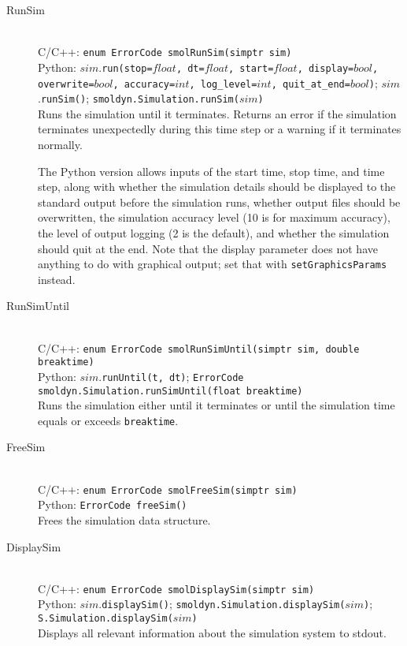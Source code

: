 \documentclass {scrbook}
\newcommand {\ttt} {\texttt}
\begin{document}
\begin{description}
\item[RunSim]
\hfill \\
C/C++: \ttt{enum ErrorCode smolRunSim(simptr sim)}\\
Python: $sim$.\ttt{run(stop=$float$, dt=$float$, start=$float$, display=$bool$, overwrite=$bool$, accuracy=$int$, log\_level=$int$, quit\_at\_end=$bool$)}; $sim$.\ttt{runSim()}; \ttt{smoldyn.Simulation.runSim($sim$)}\\
Runs the simulation until it terminates. Returns an error if the simulation terminates unexpectedly during this time step or a warning if it terminates normally.

The Python version allows inputs of the start time, stop time, and time step, along with whether the simulation details should be displayed to the standard output before the simulation runs, whether output files should be overwritten, the simulation accuracy level (10 is for maximum accuracy), the level of output logging (2 is the default), and whether the simulation should quit at the end. Note that the display parameter does not have anything to do with graphical output; set that with \ttt{setGraphicsParams} instead.

\item[RunSimUntil]
\hfill \\
C/C++: \ttt{enum ErrorCode smolRunSimUntil(simptr sim, double breaktime)}\\
Python: $sim$.\ttt{runUntil(t, dt)}; \ttt{ErrorCode smoldyn.Simulation.runSimUntil(float breaktime)}\\
Runs the simulation either until it terminates or until the simulation time equals or exceeds \ttt{breaktime}.

\item[FreeSim]
\hfill \\
C/C++: \ttt{enum ErrorCode smolFreeSim(simptr sim)}\\
Python: \ttt{ErrorCode freeSim()}\\
Frees the simulation data structure.

\item[DisplaySim]
\hfill \\
C/C++: \ttt{enum ErrorCode smolDisplaySim(simptr sim)}\\
Python: $sim$.\ttt{displaySim()}; \ttt{smoldyn.Simulation.displaySim($sim$)}; \ttt{S.Simulation.displaySim($sim$)}\\
Displays all relevant information about the simulation system to stdout.

\end{description}
\end{document}
